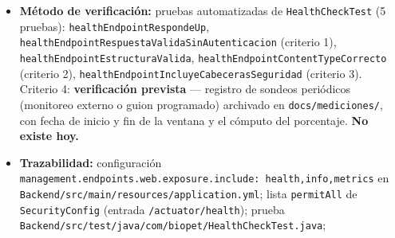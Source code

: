 \documentclass[
  spanish,
]{article}
\providecommand{\tightlist}{%
  \setlength{\itemsep}{0pt}\setlength{\parskip}{0pt}}
\begin{document}
\begin{itemize}
  \begin{enumerate}
  \def\labelenumi{\arabic{enumi}.}
  \tightlist
  \item
    \texttt{GET\ /\allowbreak{}actuator/\allowbreak{}health} responde \texttt{200\ OK} sin
    necesidad de autenticación.
  \item
    El cuerpo de la respuesta es JSON con
    \texttt{Content-\allowbreak{}Type:\ application/\allowbreak{}json} (o el tipo específico de
    Actuator) e incluye el campo \texttt{status} con valor
    \texttt{"UP"}.
  \item
    La respuesta del endpoint de salud incluye las mismas cabeceras de
    seguridad que el resto de respuestas públicas (REQ-NF-002).
  \item
    Para una ventana de evaluación declarada (fecha de inicio y fecha de
    fin), existe un registro fechado de sondeos periódicos a
    \texttt{/\allowbreak{}actuator/\allowbreak{}health} y el porcentaje de sondeos con respuesta
    \texttt{200\ OK} y \texttt{status:\ "UP"} es ≥ 99 \%.
  \end{enumerate}
\item
  \textbf{Método de verificación:} pruebas automatizadas de
  \texttt{Health\allowbreak{}Check\allowbreak{}Test} (5 pruebas):
  \texttt{health\allowbreak{}Endpoint\allowbreak{}Responde\allowbreak{}Up},
  \texttt{health\allowbreak{}Endpoint\allowbreak{}Respuesta\allowbreak{}Valida\allowbreak{}Sin\allowbreak{}Autenticacion} (criterio 1),
  \texttt{health\allowbreak{}Endpoint\allowbreak{}Estructura\allowbreak{}Valida},
  \texttt{health\allowbreak{}Endpoint\allowbreak{}Content\allowbreak{}Type\allowbreak{}Correcto} (criterio 2),
  \texttt{health\allowbreak{}Endpoint\allowbreak{}Incluye\allowbreak{}Cabeceras\allowbreak{}Seguridad} (criterio 3).
  Criterio 4: \textbf{verificación prevista} --- registro de sondeos
  periódicos (monitoreo externo o guion programado) archivado en
  \texttt{docs/\allowbreak{}mediciones/}, con fecha de inicio y fin de la ventana y
  el cómputo del porcentaje. \textbf{No existe hoy.}
\item
  \textbf{Trazabilidad:} configuración
  \texttt{management.\allowbreak{}endpoints.\allowbreak{}web.\allowbreak{}exposure.\allowbreak{}include:\ health,\allowbreak{}info,\allowbreak{}metrics}
  en \texttt{Backend/\allowbreak{}src/\allowbreak{}main/\allowbreak{}resources/\allowbreak{}application.\allowbreak{}yml}; lista
  \texttt{permit\allowbreak{}All} de \texttt{Security\allowbreak{}Config} (entrada
  \texttt{/\allowbreak{}actuator/\allowbreak{}health}); prueba
  \texttt{Backend/\allowbreak{}src/\allowbreak{}test/\allowbreak{}java/\allowbreak{}com/\allowbreak{}biopet/\allowbreak{}Health\allowbreak{}Check\allowbreak{}Test.\allowbreak{}java};

\end{itemize}
\end{document}
